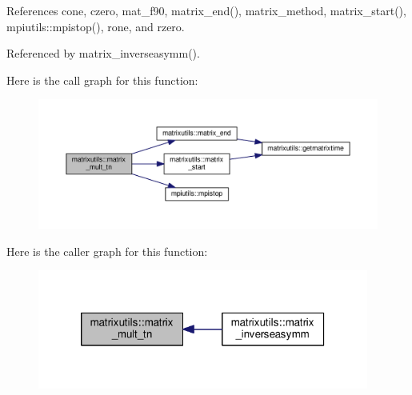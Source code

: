 References cone, czero, mat\+\_\+f90, matrix\+\_\+end(), matrix\+\_\+method, matrix\+\_\+start(), mpiutils\+::mpistop(), rone, and rzero.



Referenced by matrix\+\_\+inverseasymm().

Here is the call graph for this function\+:
\nopagebreak
\begin{figure}[H]
\begin{center}
\leavevmode
\includegraphics[width=350pt]{namespacematrixutils_a13557cd7745827af9e6873d3dbba3a1f_cgraph}
\end{center}
\end{figure}
Here is the caller graph for this function\+:
\nopagebreak
\begin{figure}[H]
\begin{center}
\leavevmode
\includegraphics[width=308pt]{namespacematrixutils_a13557cd7745827af9e6873d3dbba3a1f_icgraph}
\end{center}
\end{figure}
\mbox{\label{namespacematrixutils_a6efcf6a348628fcb3694cb23761b52ec}} 
